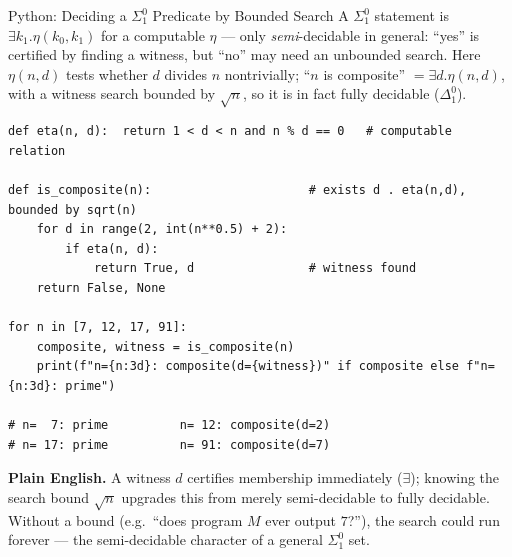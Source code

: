 \documentclass[aspectratio=169,10pt]{beamer}
\begin{document}
\begin{frame}[fragile]{Python: Deciding a $\Sigma_1^0$ Predicate by Bounded Search}
  A $\Sigma_1^0$ statement is $\exists k_1 . \eta(k_0,k_1)$ for a computable
  $\eta$ --- only \emph{semi}-decidable in general: ``yes'' is certified by
  finding a witness, but ``no'' may need an unbounded search. Here
  $\eta(n,d)$ tests whether $d$ divides $n$ nontrivially; ``$n$ is
  composite'' $= \exists d . \eta(n,d)$, with a witness search bounded by
  $\sqrt{n}$, so it is in fact fully decidable ($\Delta_1^0$).
\begin{lstlisting}
def eta(n, d):  return 1 < d < n and n % d == 0   # computable relation

def is_composite(n):                      # exists d . eta(n,d), bounded by sqrt(n)
    for d in range(2, int(n**0.5) + 2):
        if eta(n, d):
            return True, d                # witness found
    return False, None

for n in [7, 12, 17, 91]:
    composite, witness = is_composite(n)
    print(f"n={n:3d}: composite(d={witness})" if composite else f"n={n:3d}: prime")

# n=  7: prime          n= 12: composite(d=2)
# n= 17: prime          n= 91: composite(d=7)
\end{lstlisting}
  \textbf{Plain English.} A witness $d$ certifies membership immediately
  ($\exists$); knowing the search bound $\sqrt{n}$ upgrades this from merely
  semi-decidable to fully decidable. Without a bound (e.g.\ ``does program
  $M$ ever output $7$?''), the search could run forever --- the
  semi-decidable character of a general $\Sigma_1^0$ set.
\end{frame}
\end{document}

